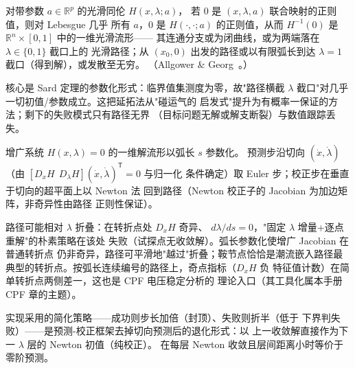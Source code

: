 \begin{theorem}\label{sec:pf-th-glob-thm-sard}
对带参数 $a\in\mathbb R^p$ 的光滑同伦 $H(x,\lambda;a)$，
若 $0$ 是 $(x,\lambda,a)$ 联合映射的正则值，则对 Lebesgue 几乎
所有 $a$，$0$ 是 $H(\cdot,\cdot;a)$ 的正则值，从而
$H^{-1}(0)$ 是 $\mathbb R^n\times[0,1]$ 中的一维光滑流形——
其连通分支或为闭曲线，或为两端落在 $\lambda\in\{0,1\}$ 截口上的
光滑路径；从 $(x_0,0)$ 出发的路径或以有限弧长到达 $\lambda=1$
截口（得到解），或发散至无穷。
（Allgower \& Georg~\cite{pfglob-allgower}。）
\end{theorem}

\begin{remark}[证明思想]\label{sec:pf-th-glob-rem-sard}
核心是 Sard 定理的参数化形式：临界值集测度为零，故"路径横截
$\lambda$ 截口"对几乎一切初值/参数成立。这把延拓法从"碰运气的
启发式"提升为有概率一保证的方法；剩下的失败模式只有路径无界
（目标问题无解或解支断裂）与数值跟踪丢失。
\end{remark}

\begin{definition}[预测-校正路径跟踪]\label{sec:pf-th-glob-def-pc}
增广系统 $H(x,\lambda)=0$ 的一维解流形以弧长 $s$ 参数化。
预测步沿切向 $(\dot x,\dot\lambda)$（由
$[D_xH\ \ D_\lambda H](\dot x,\dot\lambda)^{\mathsf T}=0$ 与归一化
条件确定）取 Euler 步；校正步在垂直于切向的超平面上以 Newton 法
回到路径（Newton 校正子的 Jacobian 为加边矩阵，非奇异性由路径
正则性保证）。
\end{definition}

\begin{remark}\label{sec:pf-th-glob-rem-turning}
路径可能相对 $\lambda$ 折叠：在转折点处 $D_xH$ 奇异、
$d\lambda/ds=0$，"固定 $\lambda$ 增量+逐点重解"的朴素策略在该处
失败（试探点无收敛解）。弧长参数化使增广 Jacobian 在普通转折点
仍非奇异，路径可平滑地"越过"折叠；鞍节点恰恰是潮流嵌入路径最
典型的转折点。按弧长连续编号的路径上，奇点指标（$D_xH$ 负
特征值计数）在简单转折点两侧差一，这也是 CPF 电压稳定分析的
理论入口（其工具化属本手册 CPF 章的主题）。
\end{remark}

\begin{remark}[步长自适应]\label{sec:pf-th-glob-rem-homstep}
实现采用的简化策略——成功则步长加倍（封顶）、失败则折半（低于
下界判失败）——是预测-校正框架去掉切向预测后的退化形式：以
上一收敛解直接作为下一 $\lambda$ 层的 Newton 初值（纯校正）。
在每层 Newton 收敛且层间距离小时等价于零阶预测。
\end{remark}

